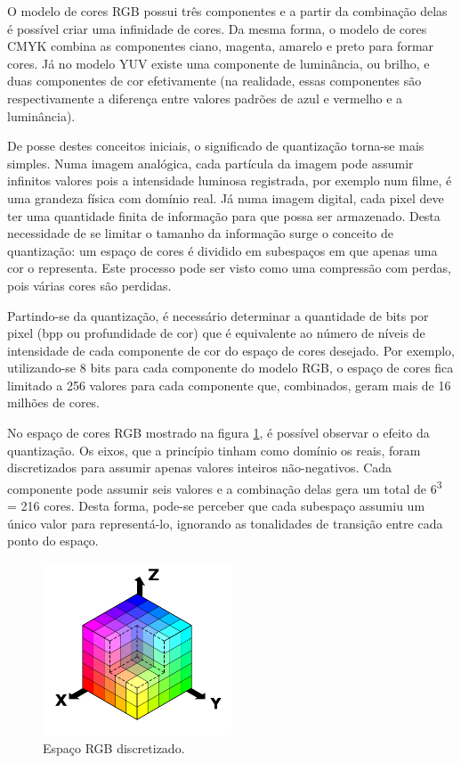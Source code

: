 O modelo de cores RGB possui três componentes e a partir da combinação delas é possível criar uma infinidade de cores. Da mesma forma, o modelo de cores CMYK combina as componentes ciano, magenta, amarelo e preto para formar cores. Já no modelo YUV existe uma componente de luminância, ou brilho, e duas componentes de cor efetivamente (na realidade, essas componentes são respectivamente a diferença entre valores padrões de azul e vermelho e a luminância).

De posse destes conceitos iniciais, o significado de quantização torna-se mais simples. Numa imagem analógica, cada partícula da imagem pode assumir infinitos valores pois a intensidade luminosa registrada, por exemplo num filme, é uma grandeza física com domínio real. Já numa imagem digital, cada pixel deve ter uma quantidade finita de informação para que possa ser armazenado. Desta necessidade de se limitar o tamanho da informação surge o conceito de quantização: um espaço de cores é dividido em subespaços em que apenas uma cor o representa. Este processo pode ser visto como uma compressão com perdas, pois várias cores são perdidas.

Partindo-se da quantização, é necessário determinar a quantidade de bits por pixel (bpp ou profundidade de cor) que é equivalente ao número de níveis de intensidade de cada componente de cor do espaço de cores desejado. Por exemplo, utilizando-se 8 bits para cada componente do modelo RGB, o espaço de cores fica limitado a 256 valores para cada componente que, combinados, geram mais de 16 milhões de cores.

No espaço de cores RGB mostrado na figura \ref{fig:rgbdiscrete}, é possível observar o efeito da quantização. Os eixos, que a princípio tinham como domínio os reais, foram discretizados para assumir apenas valores inteiros não-negativos. Cada componente pode assumir seis valores e a combinação delas gera um total de 6\textsuperscript{3} = 216 cores. Desta forma, pode-se perceber que cada subespaço assumiu um único valor para representá-lo, ignorando as tonalidades de transição entre cada ponto do espaço.

\begin{figure}[!htb]
	\centering
	\includegraphics[width=0.5\textwidth]{./imgs/rgbdiscrete.png}
	\caption{Espaço RGB discretizado.}
	\label{fig:rgbdiscrete}
\end{figure}

